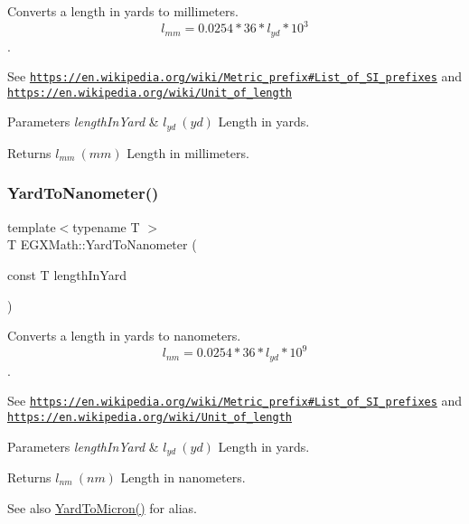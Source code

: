 Converts a length in yards to millimeters. \[ l_{mm}=0.0254 * 36 * l_{yd} * 10^{3} \]. 

See \href{https://en.wikipedia.org/wiki/Metric_prefix#List_of_SI_prefixes}{\tt https\+://en.\+wikipedia.\+org/wiki/\+Metric\+\_\+prefix\#\+List\+\_\+of\+\_\+\+S\+I\+\_\+prefixes} and \href{https://en.wikipedia.org/wiki/Unit_of_length}{\tt https\+://en.\+wikipedia.\+org/wiki/\+Unit\+\_\+of\+\_\+length} 
\begin{DoxyParams}{Parameters}
{\em length\+In\+Yard} & $ l_{yd}\ (yd)$ Length in yards. \\
\hline
\end{DoxyParams}
\begin{DoxyReturn}{Returns}
$ l_{mm}\ (mm)$ Length in millimeters. 
\end{DoxyReturn}
\mbox{\label{group___e_g_x_math-_conversions-_length_conversions-_imperial-_yard-_s_i_ga0cf6f8b8eb4601031f00134232ca3cc1}} 
\subsubsection{\texorpdfstring{Yard\+To\+Nanometer()}{YardToNanometer()}}
{\footnotesize\ttfamily template$<$typename T $>$ \\
T E\+G\+X\+Math\+::\+Yard\+To\+Nanometer (\begin{DoxyParamCaption}\item[{const T}]{length\+In\+Yard }\end{DoxyParamCaption})}



Converts a length in yards to nanometers. \[ l_{nm}=0.0254 * 36 * l_{yd} * 10^{9} \]. 

See \href{https://en.wikipedia.org/wiki/Metric_prefix#List_of_SI_prefixes}{\tt https\+://en.\+wikipedia.\+org/wiki/\+Metric\+\_\+prefix\#\+List\+\_\+of\+\_\+\+S\+I\+\_\+prefixes} and \href{https://en.wikipedia.org/wiki/Unit_of_length}{\tt https\+://en.\+wikipedia.\+org/wiki/\+Unit\+\_\+of\+\_\+length} 
\begin{DoxyParams}{Parameters}
{\em length\+In\+Yard} & $ l_{yd}\ (yd)$ Length in yards. \\
\hline
\end{DoxyParams}
\begin{DoxyReturn}{Returns}
$ l_{nm}\ (nm)$ Length in nanometers. 
\end{DoxyReturn}
\begin{DoxySeeAlso}{See also}
\mbox{\hyperlink{group___e_g_x_math-_conversions-_length_conversions-_imperial-_yard-_non-_s_i_ga7d167f52b344853fd58dcc589e0ad301}{Yard\+To\+Micron()}} for alias. 
\end{DoxySeeAlso}
\mbox{\label{group___e_g_x_math-_conversions-_length_conversions-_imperial-_yard-_s_i_gac5e73459c6a98c1aa2e613e03f7b2e57}} 
